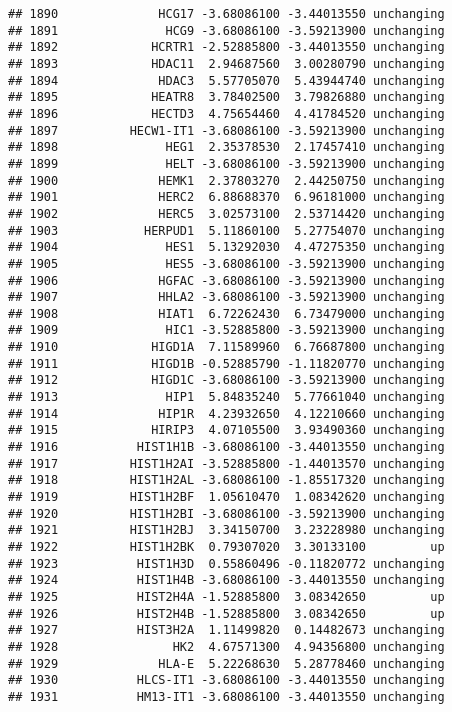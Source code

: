 \documentclass[]{article}
\begin{document}
\begin{verbatim}
## 1890              HCG17 -3.68086100 -3.44013550 unchanging
## 1891               HCG9 -3.68086100 -3.59213900 unchanging
## 1892             HCRTR1 -2.52885800 -3.44013550 unchanging
## 1893             HDAC11  2.94687560  3.00280790 unchanging
## 1894              HDAC3  5.57705070  5.43944740 unchanging
## 1895             HEATR8  3.78402500  3.79826880 unchanging
## 1896             HECTD3  4.75654460  4.41784520 unchanging
## 1897          HECW1-IT1 -3.68086100 -3.59213900 unchanging
## 1898               HEG1  2.35378530  2.17457410 unchanging
## 1899               HELT -3.68086100 -3.59213900 unchanging
## 1900              HEMK1  2.37803270  2.44250750 unchanging
## 1901              HERC2  6.88688370  6.96181000 unchanging
## 1902              HERC5  3.02573100  2.53714420 unchanging
## 1903            HERPUD1  5.11860100  5.27754070 unchanging
## 1904               HES1  5.13292030  4.47275350 unchanging
## 1905               HES5 -3.68086100 -3.59213900 unchanging
## 1906              HGFAC -3.68086100 -3.59213900 unchanging
## 1907              HHLA2 -3.68086100 -3.59213900 unchanging
## 1908              HIAT1  6.72262430  6.73479000 unchanging
## 1909               HIC1 -3.52885800 -3.59213900 unchanging
## 1910             HIGD1A  7.11589960  6.76687800 unchanging
## 1911             HIGD1B -0.52885790 -1.11820770 unchanging
## 1912             HIGD1C -3.68086100 -3.59213900 unchanging
## 1913               HIP1  5.84835240  5.77661040 unchanging
## 1914              HIP1R  4.23932650  4.12210660 unchanging
## 1915             HIRIP3  4.07105500  3.93490360 unchanging
## 1916           HIST1H1B -3.68086100 -3.44013550 unchanging
## 1917          HIST1H2AI -3.52885800 -1.44013570 unchanging
## 1918          HIST1H2AL -3.68086100 -1.85517320 unchanging
## 1919          HIST1H2BF  1.05610470  1.08342620 unchanging
## 1920          HIST1H2BI -3.68086100 -3.59213900 unchanging
## 1921          HIST1H2BJ  3.34150700  3.23228980 unchanging
## 1922          HIST1H2BK  0.79307020  3.30133100         up
## 1923           HIST1H3D  0.55860496 -0.11820772 unchanging
## 1924           HIST1H4B -3.68086100 -3.44013550 unchanging
## 1925           HIST2H4A -1.52885800  3.08342650         up
## 1926           HIST2H4B -1.52885800  3.08342650         up
## 1927           HIST3H2A  1.11499820  0.14482673 unchanging
## 1928                HK2  4.67571300  4.94356800 unchanging
## 1929              HLA-E  5.22268630  5.28778460 unchanging
## 1930           HLCS-IT1 -3.68086100 -3.44013550 unchanging
## 1931           HM13-IT1 -3.68086100 -3.44013550 unchanging

\end{verbatim}
\end{document}
